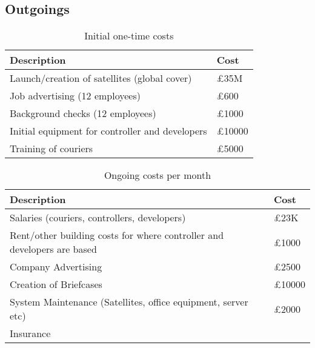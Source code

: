 \subsection{Outgoings}

\begin{table}[H]
    \centering
    \begin{tabular}{|p{}|p{}|}
        \hline
        \textbf{Description} & \textbf{Cost} \\
        \hline
        Launch/creation of satellites (global cover) & £35M \\
        \hline
        Job advertising (12 employees) & £600\\
        \hline
        Background checks (12 employees) & £1000 \\
        \hline
        Initial equipment for controller and developers & £10000\\
        \hline
        Training of couriers & £5000\\
        \hline
    \end{tabular}
    \caption{Initial one-time costs}
    \label{tab:initialCosts}
\end{table}

\begin{table}[H]
    \centering
    \begin{tabular}{|p{}|p{}|}
        \hline
        \textbf{Description} & \textbf{Cost} \\
        \hline
        Salaries (couriers, controllers, developers) & £23K\\
        \hline
        Rent/other building costs for where controller and developers are based & £1000\\
        \hline
        Company Advertising & £2500\\
        \hline
        Creation of Briefcases & £10000\\
        \hline
        System Maintenance (Satellites, office equipment, server etc) & £2000\\
        \hline
        Insurance & \\
        \hline
    \end{tabular}
    \caption{Ongoing costs per month}
    \label{tab:ongoingCosts}
\end{table}

